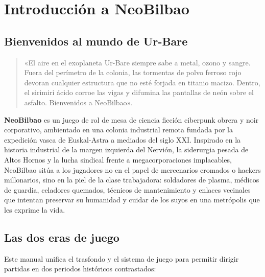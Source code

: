 \chapter{Introducción a NeoBilbao}

\section{Bienvenidos al mundo de Ur-Bare}


\begin{quote}
«El aire en el exoplaneta Ur-Bare siempre sabe a metal, ozono y sangre. Fuera del perímetro de la colonia, las tormentas de polvo ferroso rojo devoran cualquier estructura que no esté forjada en titanio macizo. Dentro, el sirimiri ácido corroe las vigas y difumina las pantallas de neón sobre el asfalto. Bienvenidos a NeoBilbao».
\end{quote}

\textbf{NeoBilbao} es un juego de rol de mesa de ciencia ficción ciberpunk obrera y noir corporativo, ambientado en una colonia industrial remota fundada por la expedición vasca de Euskal-Astra a mediados del siglo XXI. Inspirado en la historia industrial de la margen izquierda del Nervión, la siderurgia pesada de Altos Hornos y la lucha sindical frente a megacorporaciones implacables, NeoBilbao sitúa a los jugadores no en el papel de mercenarios cromados o hackers millonarios, sino en la piel de la clase trabajadora: soldadores de plasma, médicos de guardia, celadores quemados, técnicos de mantenimiento y enlaces vecinales que intentan preservar su humanidad y cuidar de los suyos en una metrópolis que les exprime la vida.

\section{Las dos eras de juego}

Este manual unifica el trasfondo y el sistema de juego para permitir dirigir partidas en dos periodos históricos contrastados:

